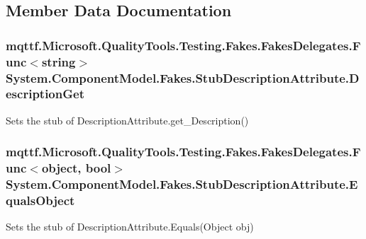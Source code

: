 \subsection{Member Data Documentation}
\hypertarget{class_system_1_1_component_model_1_1_fakes_1_1_stub_description_attribute_ada068b4e3abde6f012d158944638ae71}{
\subsubsection[{Description\-Get}]{\setlength{\rightskip}{0pt plus 5cm}mqttf.\-Microsoft.\-Quality\-Tools.\-Testing.\-Fakes.\-Fakes\-Delegates.\-Func$<$string$>$ System.\-Component\-Model.\-Fakes.\-Stub\-Description\-Attribute.\-Description\-Get}}\label{class_system_1_1_component_model_1_1_fakes_1_1_stub_description_attribute_ada068b4e3abde6f012d158944638ae71}


Sets the stub of Description\-Attribute.\-get\-\_\-\-Description()

\hypertarget{class_system_1_1_component_model_1_1_fakes_1_1_stub_description_attribute_aac8eccb95bac47fdbe8064dac9887c4e}{
\subsubsection[{Equals\-Object}]{\setlength{\rightskip}{0pt plus 5cm}mqttf.\-Microsoft.\-Quality\-Tools.\-Testing.\-Fakes.\-Fakes\-Delegates.\-Func$<$object, bool$>$ System.\-Component\-Model.\-Fakes.\-Stub\-Description\-Attribute.\-Equals\-Object}}\label{class_system_1_1_component_model_1_1_fakes_1_1_stub_description_attribute_aac8eccb95bac47fdbe8064dac9887c4e}


Sets the stub of Description\-Attribute.\-Equals(\-Object obj)

